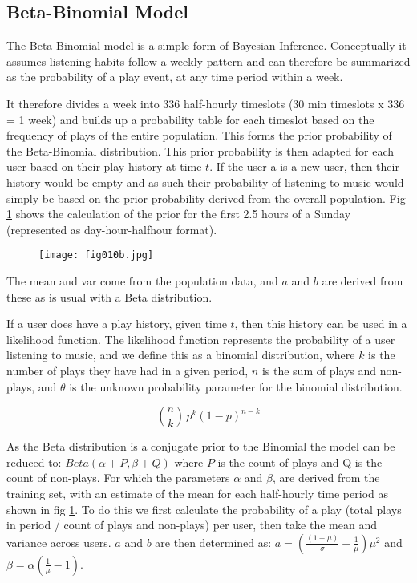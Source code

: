 \subsection{Beta-Binomial Model}

The Beta-Binomial model is a simple form of Bayesian Inference. Conceptually it assumes listening habits follow a weekly pattern and can therefore be summarized as the probability of a play event, at any time period within a week.

It therefore divides a week into 336 half-hourly timeslots (30 min timeslots x 336 = 1 week) and builds up a probability table for each timeslot based on the frequency of plays of the entire population. This forms the prior probability of the Beta-Binomial distribution. 
This prior probability is then adapted for each user based on their play history at time $t$. If the user a is a new user, then their history would be empty and as such their probability of listening to music would simply be based on the prior probability derived from the overall population. Fig \ref{fig10b} shows the calculation of the prior for the first 2.5 hours of a Sunday (represented as day-hour-halfhour format). 

\begin{figure}[h!]
	\centering
	\texttt{[image: fig010b.jpg]}
	\caption{}
	\label{fig10b}
\end{figure} 

The mean and var come from the population data, and $a$ and $b$ are derived from these as is usual with a Beta distribution.

If a user does have a play history, given time $t$, then this history can be used in a likelihood function. The likelihood function represents the probability of a user listening to music, and we define this as a binomial distribution, where $k$ is the number of plays they have had in a given period, $n$ is the sum of plays and non-plays, and $\theta$ is the unknown probability parameter for the binomial distribution.

$${n \choose k}\,p^{k}(1-p)^{n-k}$$

As the Beta distribution is a conjugate prior to the Binomial the model can be reduced to: $Beta(\alpha+P, \beta+Q)$ where $P$ is the count of plays and Q is the count of non-plays. For which the parameters $\alpha$ and $\beta$, are derived from the training set, with an estimate of the mean for each half-hourly time period as shown in fig \ref{fig10b}. To do this we first calculate the probability of a play (total plays in period / count of plays and non-plays) per user, then take the mean and variance across users. $a$ and $b$ are then determined as:
$a = (\frac{(1- \mu)}{\sigma} - \frac{1}{\mu}) \mu^2$
and
$\beta=\alpha\left(\frac{1}{\mu}-1\right)$.

